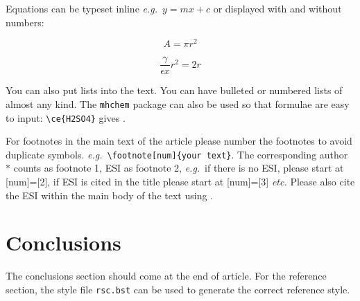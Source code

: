 \documentclass[twoside,twocolumn,9pt]{article}
\begin{document}
Equations can be typeset inline \textit{e.g.}\ $ y = mx + c$ or displayed with and without numbers:

 \[ A = \pi r^2 \]

\begin{equation}
  \frac{\gamma}{\epsilon x} r^2 = 2r
\end{equation}

You can also put lists into the text. You can have bulleted or numbered lists of almost any kind. 
The \texttt{mhchem} package can also be used so that formulae are easy to input: \texttt{\textbackslash ce\{H2SO4\}} gives . 

For footnotes in the main text of the article please number the footnotes to avoid duplicate symbols. \textit{e.g.}\ \texttt{\textbackslash footnote[num]\{your text\}}. The corresponding author $\ast$ counts as footnote 1, ESI as footnote 2, \textit{e.g.}\ if there is no ESI, please start at [num]=[2], if ESI is cited in the title please start at [num]=[3] \textit{etc.} Please also cite the ESI within the main body of the text using \dag.

\section{Conclusions}
The conclusions section should come at the end of article. For the reference section, the style file \texttt{rsc.bst} can be used to generate the correct reference style.


\balance


\end{document}
